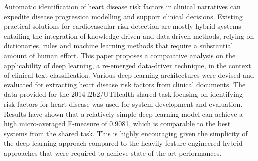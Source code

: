 Automatic identification of heart disease risk factors in clinical narratives can expedite disease progression modelling and support clinical decisions. Existing practical solutions for cardiovascular risk detection are mostly hybrid systems entailing the integration of knowledge-driven and data-driven methods, relying on dictionaries, rules and machine learning methods that require a substantial amount of human effort. This paper proposes a comparative analysis on the applicability of deep learning, a re-emerged data-driven technique, in the context of clinical text classification. Various deep learning architectures were devised and evaluated for extracting heart disease risk factors from clinical documents. The data provided for the 2014 i2b2/UTHealth shared task focusing on identifying risk factors for heart disease was used for system development and evaluation. Results have shown that a relatively simple deep learning model can achieve a high micro-averaged F-measure of 0.9081, which is comparable to the best systems from the shared task. This is highly encouraging given the simplicity of the deep learning approach compared to the heavily feature-engineered hybrid approaches that were required to achieve state-of-the-art performances.
